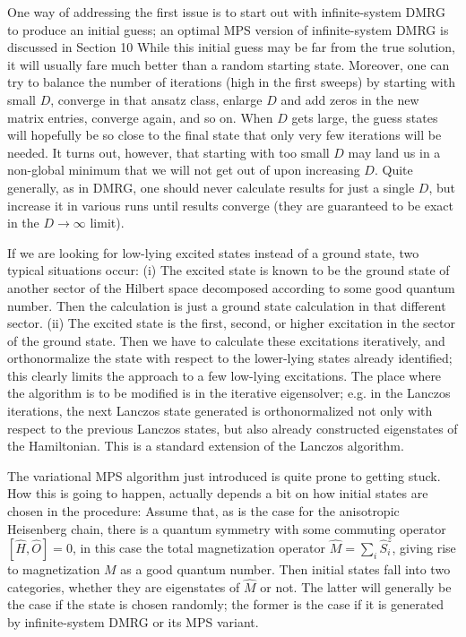 \documentclass[12pt]{article}
\begin{document}
One way of addressing the first issue is to start out with infinite-system DMRG to produce an initial guess; an optimal MPS version of infinite-system DMRG is discussed in Section 10 While this initial guess may be far from the true solution, it will usually fare much better than a random starting state. Moreover, one can try to balance the number of iterations (high in the first sweeps) by starting with small $D$, converge in that ansatz class, enlarge $D$ and add zeros in the new matrix entries, converge again, and so on. When $D$ gets large, the guess states will hopefully be so close to the final state that only very few iterations will be needed. It turns out, however, that starting with too small $D$ may land us in a non-global minimum that we will not get out of upon increasing $D$. Quite generally, as in DMRG, one should never calculate results for just a single $D$, but increase it in various runs until results converge (they are guaranteed to be exact in the $D \rightarrow \infty$ limit).

If we are looking for low-lying excited states instead of a ground state, two typical situations occur: (i) The excited state is known to be the ground state of another sector of the Hilbert space decomposed according to some good quantum number. Then the calculation is just a ground state calculation in that different sector. (ii) The excited state is the first, second, or higher excitation in the sector of the ground state. Then we have to calculate these excitations iteratively, and orthonormalize the state with respect to the lower-lying states already identified; this clearly limits the approach to a few low-lying excitations. The place where the algorithm is to be modified is in the iterative eigensolver; e.g. in the Lanczos iterations, the next Lanczos state generated is orthonormalized not only with respect to the previous Lanczos states, but also already constructed eigenstates of the Hamiltonian. This is a standard extension of the Lanczos algorithm.

The variational MPS algorithm just introduced is quite prone to getting stuck. How this is going to happen, actually depends a bit on how initial states are chosen in the procedure: Assume that, as is the case for the anisotropic Heisenberg chain, there is a quantum symmetry with some commuting operator $[\hat{H}, \hat{O}]=0$, in this case the total magnetization operator $\hat{M}=\sum_{i} \hat{S}_{i}^{z}$, giving rise to magnetization $M$ as a good quantum number. Then initial states fall into two categories, whether they are eigenstates of $\hat{M}$ or not. The latter will generally be the case if the state is chosen randomly; the former is the case if it is generated by infinite-system DMRG or its MPS variant.
\end{document}
